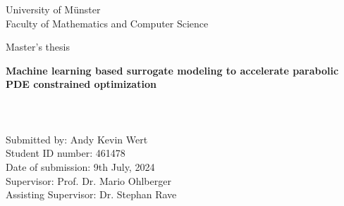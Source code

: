 \thispagestyle{empty}
\begin{titlepage}
	 \thispagestyle{empty}
\begin{center}
 \thispagestyle{empty}

$~~$\\
{\large University of Münster}\\
\smallskip
{\large Faculty of Mathematics and Computer Science}
\vfill
{\Large Master's thesis\par}
\vspace{1.5cm}
{\LARGE\bfseries Machine learning based surrogate modeling to accelerate parabolic PDE constrained optimization\par}
\paragraph{}$~~$\\
\paragraph{}$~~$\\
\paragraph{}$~~$\\
{\large Submitted by: Andy Kevin Wert}\\
\medskip
{\large Student ID number: 461478}\\
\medskip
{\large Date of submission: 9th July, 2024}\\
\medskip
{\large Supervisor: Prof. Dr. Mario Ohlberger}\\
\medskip
{\large Assisting Supervisor: Dr. Stephan Rave}\\
\vfill


\end{center}	
\end{titlepage}
